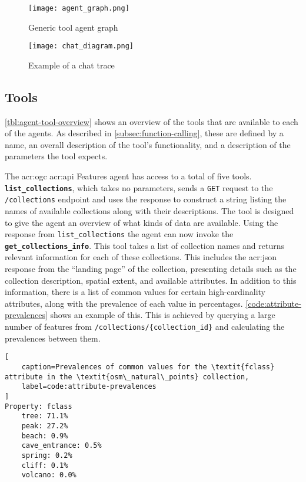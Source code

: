 \begin{figure}[h]
    \centering
    \texttt{[image: agent\_graph.png]}
    \caption{Generic tool agent graph}
    \label{fig:tool-agent-graph}
\end{figure}

\begin{figure}[h]
    \centering
    \texttt{[image: chat\_diagram.png]}
    \caption{Example of a chat trace}
    \label{fig:chat-trace-example}
\end{figure}

\subsection{Tools}
\label{subsec:tools}

\autoref{tbl:agent-tool-overview} shows an overview of the tools that are available to each of the agents. As described in \autoref{subsec:function-calling}, these are defined by a name, an overall description of the tool's functionality, and a description of the parameters the tool expects.

The \acrshort{acr:ogc} \acrshort{acr:api} Features agent has access to a total of five tools. \textbf{\texttt{list\_collections}}, which takes no parameters, sends a \texttt{GET} request to the \texttt{/collections} endpoint and uses the response to construct a string listing the names of available collections along with their descriptions. The tool is designed to give the agent an overview of what kinds of data are available. Using the response from \texttt{list\_collections} the agent can now invoke the \textbf{\texttt{get\_collections\_info}}. This tool takes a list of collection names and returns relevant information for each of these collections. This includes the \acrshort{acr:json} response from the \enquote{landing page} of the collection, presenting details such as the collection description, spatial extent, and available attributes. In addition to this information, there is a list of common values for certain high-cardinality attributes, along with the prevalence of each value in percentages. \autoref{code:attribute-prevalences} shows an example of this. This is achieved by querying a large number of features from \texttt{/collections/\{collection\_id\}} and calculating the prevalences between them.

\begin{lstlisting}[
    caption=Prevalences of common values for the \textit{fclass} attribute in the \textit{osm\_natural\_points} collection,
    label=code:attribute-prevalences
]
Property: fclass
    tree: 71.1%
    peak: 27.2%
    beach: 0.9%
    cave_entrance: 0.5%
    spring: 0.2%
    cliff: 0.1%
    volcano: 0.0%
\end{lstlisting}

